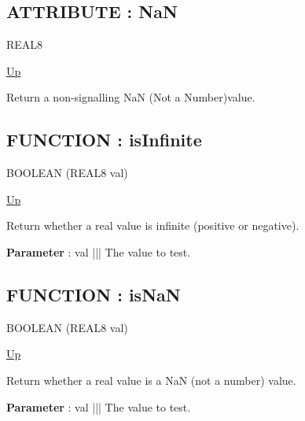 \subsection*{ATTRIBUTE : NaN}
\hypertarget{ecldoc:math.nan}{}
\par
\begin{minipage}[t]{\textwidth}
\begin{flushleft}
REAL8  
\end{flushleft}
\end{minipage}
\hyperlink{ecldoc:Math}{Up} \\
\par
Return a non-signalling NaN (Not a Number)value. \\
\par
\subsection*{FUNCTION : isInfinite}
\hypertarget{ecldoc:math.isinfinite}{}
\par
\begin{minipage}[t]{\textwidth}
\begin{flushleft}
BOOLEAN  (REAL8 val)
\end{flushleft}
\end{minipage}
\hyperlink{ecldoc:Math}{Up} \\
\par
Return whether a real value is infinite (positive or negative). \\
\par
\textbf{Parameter} : val ||| The value to test. \\
\subsection*{FUNCTION : isNaN}
\hypertarget{ecldoc:math.isnan}{}
\par
\begin{minipage}[t]{\textwidth}
\begin{flushleft}
BOOLEAN  (REAL8 val)
\end{flushleft}
\end{minipage}
\hyperlink{ecldoc:Math}{Up} \\
\par
Return whether a real value is a NaN (not a number) value. \\
\par
\textbf{Parameter} : val ||| The value to test. \\

